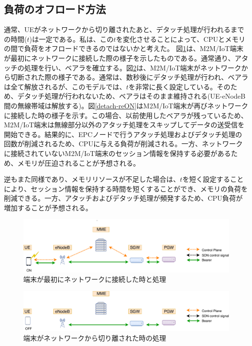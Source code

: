 \documentclass[a4j]{ujarticle}
\begin{document}
\subsection{負荷のオフロード方法}
\label{sec:des}
通常、UEがネットワークから切り離されたあと、デタッチ処理が行われるまでの時間($t$)は一定である。私は、この$t$を変化させることによって、CPUとメモリの間で負荷をオフロードできるのではないかと考えた。
図\ref{detach-ON}は、M2M/IoT端末が最初にネットワークに接続した際の様子を示したものである。通常通り、アタッチの処理を行い、ベアラを確立する。図\ref{detach-OFF}は、M2M/IoT端末がネットワークから切断された際の様子である。通常は、数秒後にデタッチ処理が行われ、ベアラは全て解放されるが、このモデルでは、$t$を非常に長く設定している。そのため、デタッチ処理が行われないため、ベアラはそのまま維持される(UE-eNodeB間の無線帯域は解放する)。図\ref{detach-reON}はM2M/IoT端末が再びネットワークに接続した時の様子を示す。この場合、以前使用したベアラが残っているため、M2M/IoT端末は無線部分以外のアタッチ処理をスキップしてデータの送受信を開始できる。結果的に、EPCノードで行うアタッチ処理およびデタッチ処理の回数が削減されるため、CPUに与える負荷が削減される。一方、ネットワークに接続されていないM2M/IoT端末のセッション情報を保持する必要があるため、メモリが圧迫されることが予想される。

逆もまた同様であり、メモリリソースが不足した場合は、$t$を短く設定することにより、セッション情報を保持する時間を短くすることができ、メモリの負荷を削減できる。一方、アタッチおよびデタッチ処理が頻発するため、CPU負荷が増加することが予想される。


\begin{figure}[htbp]
	\centering
	\includegraphics[width=0.7\hsize]{detach-ON.pdf}
  \caption{端末が最初にネットワークに接続した時と処理}
	\label{detach-ON}
\end{figure}

\begin{figure}[htbp]
	\centering
	\includegraphics[width=0.7\hsize]{detach-OFF.pdf}
  \caption{端末がネットワークから切り離された時の処理}
	\label{detach-OFF}
\end{figure}
\end{document}
